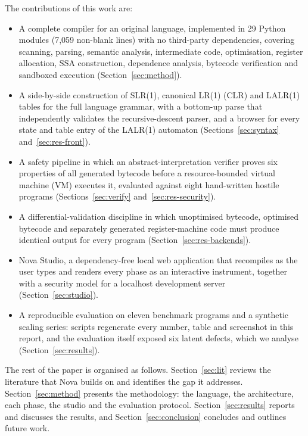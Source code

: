 \documentclass[conference]{IEEEtran}
\begin{document}
The contributions of this work are:
\begin{itemize}
\item A complete compiler for an original language, implemented in 29 Python modules (7,059 non-blank lines) with no third-party dependencies, covering scanning, parsing, semantic analysis, intermediate code, optimisation, register allocation, SSA construction, dependence analysis, bytecode verification and sandboxed execution (Section~\ref{sec:method}).
\item A side-by-side construction of SLR(1), canonical LR(1) (CLR) and LALR(1) tables for the full language grammar, with a bottom-up parse that independently validates the recursive-descent parser, and a browser for every state and table entry of the LALR(1) automaton (Sections~\ref{sec:syntax} and~\ref{sec:res-front}).
\item A safety pipeline in which an abstract-interpretation verifier proves six properties of all generated bytecode before a resource-bounded virtual machine (VM) executes it, evaluated against eight hand-written hostile programs (Sections~\ref{sec:verify} and~\ref{sec:res-security}).
\item A differential-validation discipline in which unoptimised bytecode, optimised bytecode and separately generated register-machine code must produce identical output for every program (Section~\ref{sec:res-backends}).
\item Nova Studio, a dependency-free local web application that recompiles as the user types and renders every phase as an interactive instrument, together with a security model for a localhost development server (Section~\ref{sec:studio}).
\item A reproducible evaluation on eleven benchmark programs and a synthetic scaling series: scripts regenerate every number, table and screenshot in this report, and the evaluation itself exposed six latent defects, which we analyse (Section~\ref{sec:results}).
\end{itemize}

The rest of the paper is organised as follows. Section~\ref{sec:lit} reviews the literature that Nova builds on and identifies the gap it addresses. Section~\ref{sec:method} presents the methodology: the language, the architecture, each phase, the studio and the evaluation protocol. Section~\ref{sec:results} reports and discusses the results, and Section~\ref{sec:conclusion} concludes and outlines future work.

\end{document}
